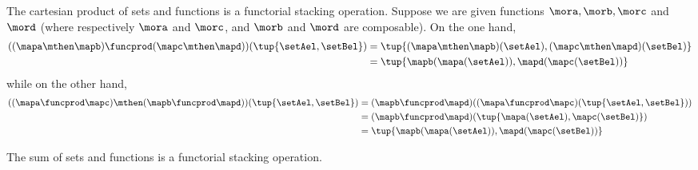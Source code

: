 \begin{example}
    The cartesian product of sets and functions is a functorial stacking operation.
    Suppose we are given functions $\mora, \morb, \morc$ and $\mord$ (where respectively $\mora$ and $\morc$, and $\morb$ and $\mord$ are composable).
    On the one hand,
    \begin{align}
        ((\mapa \mthen \mapb) \funcprod (\mapc \mthen \mapd))(\tup{\setAel, \setBel}) & = \tup{(\mapa \mthen \mapb)(\setAel), (\mapc \mthen \mapd)(\setBel)} \\
                                                                                      & = \tup{\mapb(\mapa(\setAel)), \mapd(\mapc(\setBel))}
    \end{align}
    while on the other hand,
    \begin{align}
        ((\mapa \funcprod \mapc) \mthen (\mapb \funcprod \mapd))(\tup{\setAel, \setBel}) & = (\mapb \funcprod \mapd)((\mapa \funcprod \mapc)(\tup{\setAel, \setBel})) \\
                                                                                         & = (\mapb \funcprod \mapd)(\tup{\mapa(\setAel),  \mapc(\setBel)}) \\
                                                                                         & = \tup{\mapb(\mapa(\setAel)), \mapd(\mapc(\setBel))}
    \end{align}
\end{example}

\begin{example}
    The sum of sets and functions is a functorial stacking operation.
\end{example}


